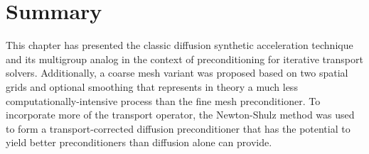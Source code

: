 \section{Summary}

This chapter has presented the classic diffusion 
synthetic acceleration technique and its multigroup analog in the 
context of preconditioning for iterative transport solvers.  Additionally,
a coarse mesh variant was proposed based on two spatial grids and 
optional smoothing that represents in theory a 
much less computationally-intensive process than the fine mesh 
preconditioner. To incorporate more of the transport operator, 
the Newton-Shulz method was used to form a transport-corrected 
diffusion preconditioner that has the potential to yield better 
preconditioners than diffusion alone can provide.